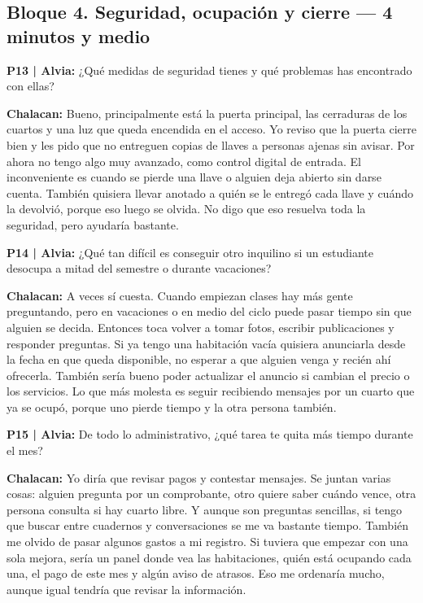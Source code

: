 \documentclass[11pt,a4paper]{article}
\newcommand{\habla}[2]{
    \par\noindent\hspace*{0.8em}\textbf{#1:} #2\par
}
\newcommand{\pregunta}[2]{
    \par\noindent\textbf{P#1 | Alvia:} #2\par
}
\begin{document}
\subsection*{Bloque 4. Seguridad, ocupación y cierre — 4 minutos y medio}

\pregunta{13}{
¿Qué medidas de seguridad tienes y qué problemas has encontrado con ellas?
}

\habla{Chalacan}{
Bueno, principalmente está la puerta principal, las cerraduras de los cuartos y una luz que queda encendida en el acceso. Yo reviso que la puerta cierre bien y les pido que no entreguen copias de llaves a personas ajenas sin avisar. Por ahora no tengo algo muy avanzado, como control digital de entrada. El inconveniente es cuando se pierde una llave o alguien deja abierto sin darse cuenta. También quisiera llevar anotado a quién se le entregó cada llave y cuándo la devolvió, porque eso luego se olvida. No digo que eso resuelva toda la seguridad, pero ayudaría bastante.
}



\clearpage

\pregunta{14}{
¿Qué tan difícil es conseguir otro inquilino si un estudiante desocupa a mitad del semestre o durante vacaciones?
}

\habla{Chalacan}{
A veces sí cuesta. Cuando empiezan clases hay más gente preguntando, pero en vacaciones o en medio del ciclo puede pasar tiempo sin que alguien se decida. Entonces toca volver a tomar fotos, escribir publicaciones y responder preguntas. Si ya tengo una habitación vacía quisiera anunciarla desde la fecha en que queda disponible, no esperar a que alguien venga y recién ahí ofrecerla. También sería bueno poder actualizar el anuncio si cambian el precio o los servicios. Lo que más molesta es seguir recibiendo mensajes por un cuarto que ya se ocupó, porque uno pierde tiempo y la otra persona también.
}


\pregunta{15}{
De todo lo administrativo, ¿qué tarea te quita más tiempo durante el mes?
}

\habla{Chalacan}{
Yo diría que revisar pagos y contestar mensajes. Se juntan varias cosas: alguien pregunta por un comprobante, otro quiere saber cuándo vence, otra persona consulta si hay cuarto libre. Y aunque son preguntas sencillas, si tengo que buscar entre cuadernos y conversaciones se me va bastante tiempo. También me olvido de pasar algunos gastos a mi registro. Si tuviera que empezar con una sola mejora, sería un panel donde vea las habitaciones, quién está ocupando cada una, el pago de este mes y algún aviso de atrasos. Eso me ordenaría mucho, aunque igual tendría que revisar la información.
}
\end{document}
